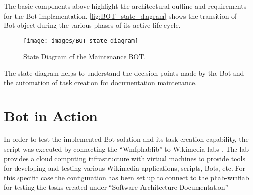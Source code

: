 The basic components above highlight the architectural outline and requirements for the Bot implementation. \autoref{fig:BOT_state_diagram} shows the transition of Bot object during the various phases of its active life-cycle.
\begin{figure}
  \centering
  \texttt{[image: images/BOT\_state\_diagram]}
  \caption[State Diagram of the Maintenance BOT]{State Diagram of the Maintenance BOT.}\label{fig:BOT_state_diagram}
\end{figure}
The state diagram helps to understand the decision points made by the Bot and the automation of task creation for documentation maintenance.


\section{Bot in Action}
In order to test the implemented Bot solution and its task creation capability, the script was executed by connecting the \enquote{Wmfphablib} to Wikimedia labs \cite{Wm_labs}. The lab provides a cloud computing infrastructure with virtual machines to provide tools for developing and testing various Wikimedia applications, scripts, Bots, etc. For this specific case the configuration has been set up to connect to the phab-wmflab \cite{phab_labs} for testing the tasks created under \enquote{Software Architecture Documentation}
